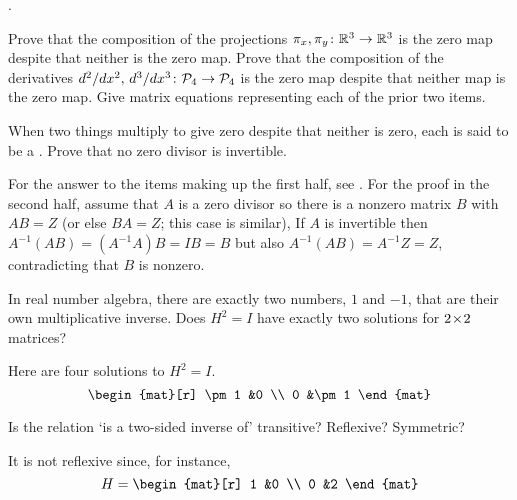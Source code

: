 \begin{exercises}
{    .}
    \begin{exparts}
      \partsitem Prove that the composition of the projections
        \( \mbox{$\pi_x,\pi_y\colon \mathbb{R}^3\to \mathbb{R}^3$} \) is the zero map despite that
        neither is the zero map.
      \partsitem Prove that the composition of the derivatives
        \( \mbox{$d^2/dx^2,\,d^3/dx^3\colon \mathcal{P}_4\to \mathcal{P}_4$} \)
        is the zero map despite that neither map is the zero map.
      \partsitem Give matrix equations representing each of the prior two
        items.
    \end{exparts}
    When two things multiply to give zero despite that neither is zero, each is
    said to be a .
    Prove that no zero divisor is invertible.
    \begin{answer}
      For the answer to the items making up the first half, see 
      .
      For the proof in the second half, assume that $A$ is a zero divisor so
      there is a nonzero matrix $B$ with $AB=Z$ 
      (or else $BA=Z$; this case is similar), 
      If $A$ is invertible
      then $A^{-1}(AB)=(A^{-1}A)B=IB=B$ but also
      $A^{-1}(AB)=A^{-1}Z=Z$, contradicting that $B$ is nonzero.
    \end{answer}
  \item 
    In real number algebra, there are exactly two numbers, $1$ and $-1$, 
    that are their own multiplicative inverse.
    Does \( H^2=I \) have exactly two solutions for \( 2 \! \times \! 2 \)
    matrices?
    \begin{answer}
      Here are four solutions to \( H^2=I \).
      \begin{equation*}
        \begin{mat}[r]
          \pm 1  &0  \\
          0      &\pm 1
        \end{mat}
      \end{equation*}   
    \end{answer}
  \item 
   Is the relation `is a two-sided inverse of' transitive?
   Reflexive?
   Symmetric?
   \begin{answer}
     It is not reflexive since, for instance, 
     \begin{equation*}
       H=\begin{mat}[r]
         1  &0  \\
         0  &2
       \end{mat}
     \end{equation*}

\end{answer}
\end{exercises}

